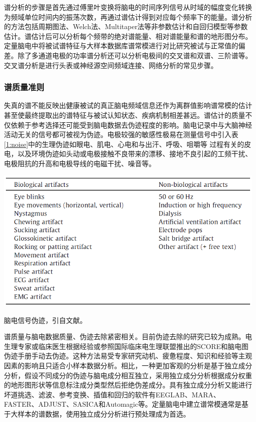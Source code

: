 谱分析的步骤是首先通过傅里叶变换将脑电的时间序列信号从时域的幅度变化转换为频域单位时间内的振荡次数，再通过谱估计得到对应每个频率下的能量。谱分析的方法包括周期图法、Welch法、Multitaper法等非参数估计和自回归模型等参数估计。谱估计后可以分析每个频带的绝对谱能量、相对谱能量和谱的地形图分布。定量脑电中将被试谱特征与大样本数据库谱常模进行对比研究被试与正常值的偏差。除了多通道电极的功率谱分析还可以分析电极间的交叉谱和双谱、三阶谱等。交叉谱分析是进行头表或神经源空间频域连接、网络分析的常见步骤。

\subsubsection{谱质量准则}
失真的谱不能反映出健康被试的真正脑电频域信息还作为离群值影响谱常模的估计甚至使最终提取出的谱特征与被试认知状态、疾病机制相差甚远。谱估计的质量不仅依赖于参考选择还可能受到脑电数据去伪迹程度的影响。脑电记录中与大脑神经活动无关的信号都可被视为伪迹。电极较强的敏感性极易在测量信号中引入表\ref{1:noise}中的生理伪迹如眼电、肌电、心电和与出汗、呼吸、咀嚼等
过程有关的皮电，以及环境伪迹如头动或电极接触不良带来的漂移、接地不良引起的工频干扰、电极阻抗的升高和电极导线的电磁干扰、噪音等。
\bigskip
\begin{table}[!h]
	\includegraphics[width=14cm]{pic/xulun/EEGnoise.png}
	\caption{脑电信号伪迹，引自文献。}
	\label{1:noise}
\end{table}

谱质量与脑电数据质量、伪迹去除紧密相关。目前伪迹去除的研究已较为成熟。电生理专家或临床医生根据经验或参照国际临床电生理联盟推出的SCORE和脑电图伪迹手册手动去伪迹。这种方法易受专家研究动机、疲惫程度、知识和经验等主观因素的影响且只适合小样本数据分析。相比，一种更加客观的分析是基于独立成分分析，假设不同成分的伪迹与脑电成分相互独立，采用独立成分分析根据成分权重的地形图形状等信息标注成分类型然后拒绝伪差成分。具有独立成分分析又能进行坏道挑选、滤波、参考变换、插值和回归的软件有EEGLAB、MARA、FASTER、ADJUST、SASICA和Automagic等。定量脑电中建立谱常模通常是基于大样本的谱数据，使用独立成分分析进行预处理成为首选。


